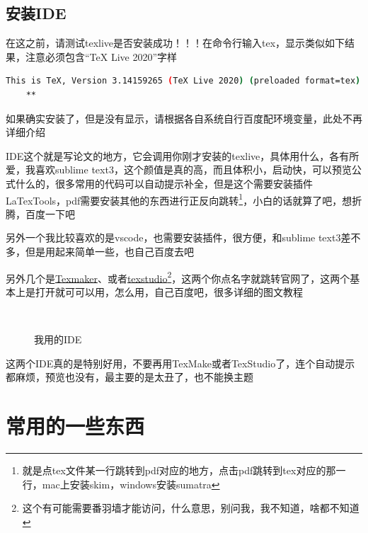 \documentclass[AutoFakeBold]{LZUThesis2007}
\begin{document}


\subsection{安装IDE} %
\label{sub:安装ide}

在这之前，请测试texlive是否安装成功！！！在命令行输入tex，显示类似如下结果，注意必须包含“TeX Live 2020”字样

\begin{lstlisting}[language=bash]
    This is TeX, Version 3.14159265 (TeX Live 2020) (preloaded format=tex)
    **
\end{lstlisting}


如果确实安装了，但是没有显示，请根据各自系统自行百度配环境变量，此处不再详细介绍


IDE这个就是写论文的地方，它会调用你刚才安装的texlive，具体用什么，各有所爱，我喜欢sublime text3，这个颜值是真的高，而且体积小，启动快，可以预览公式什么的，很多常用的代码可以自动提示补全，但是这个需要安装插件LaTexTools，pdf需要安装其他的东西进行正反向跳转\footnote{就是点tex文件某一行跳转到pdf对应的地方，点击pdf跳转到tex对应的那一行，mac上安装skim，windows安装sumatra}，小白的话就算了吧，想折腾，百度一下吧


另外一个我比较喜欢的是vscode，也需要安装插件，很方便，和sublime text3差不多，但是用起来简单一些，也自己百度去吧

另外几个是\href{https://www.xm1math.net/texmaker}{Texmaker}、或者\href{http://texstudio.sourceforge.net/}{texstudio}\footnote{这个有可能需要番羽墙才能访问，什么意思，别问我，我不知道，啥都不知道}，这两个你点名字就跳转官网了，这两个基本上是打开就可可以用，怎么用，自己百度吧，很多详细的图文教程


\begin{figure}[H]
	\centering
	\qquad
	\\
    \caption{我用的IDE}
    \label{fig_ide}
\end{figure}

这两个IDE真的是特别好用，不要再用TexMake或者TexStudio了，连个自动提示都麻烦，预览也没有，最主要的是太丑了，也不能换主题



\section{常用的一些东西} %
\label{sec:常用的一些东西}
\end{document}
